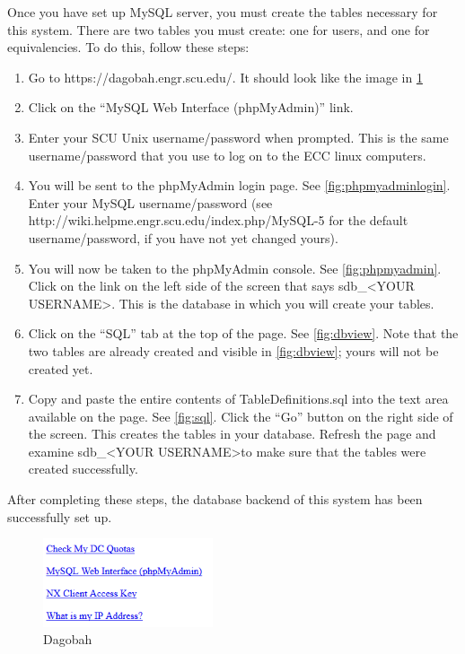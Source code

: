 \documentclass{article}
\begin{document}
\par Once you have set up MySQL server, you must create the tables necessary for
this system.  There are two tables you must create: one for users, and one for
equivalencies.  To do this, follow these steps:
\begin{enumerate}
\item Go to https://dagobah.engr.scu.edu/.  It should look like the image in
\cref{fig:dagobah}
\item Click on the ``MySQL Web Interface (phpMyAdmin)'' link.
\item Enter your SCU Unix username/password when prompted. This is the same
username/password that you use to log on to the ECC linux computers.
\item You will be sent to the phpMyAdmin login page. See \cref{fig:phpmyadminlogin}.
Enter your MySQL
username/password (see http://wiki.helpme.engr.scu.edu/index.php/MySQL-5 for
the default username/password, if you have not yet changed yours).
\item You will now be taken to the phpMyAdmin console. See \cref{fig:phpmyadmin}.
Click on the link on the left side of the screen that says sdb\_\textless YOUR
USERNAME\textgreater .
This is the database in which you will create your tables.
\item Click on the ``SQL'' tab at the top of the page. See \cref{fig:dbview}. Note
that the two tables are already created and visible in \cref{fig:dbview}; yours will not be
created yet.
\item Copy and paste the entire contents of TableDefinitions.sql into the text
area available on the page. See \cref{fig:sql}.  Click the ``Go'' button on the
right side of the screen.  This creates the tables in your database.  Refresh
the page and examine sdb\_\textless YOUR USERNAME\textgreater  to make sure that
the tables were
created successfully.
\end{enumerate}
\par After completing these steps, the database backend of this system has been
successfully set up.

\begin{figure}[h]
\includegraphics[width=5cm]{dagobah}
\centering
\caption{Dagobah}
\label{fig:dagobah}
\end{figure}
\end{document}

